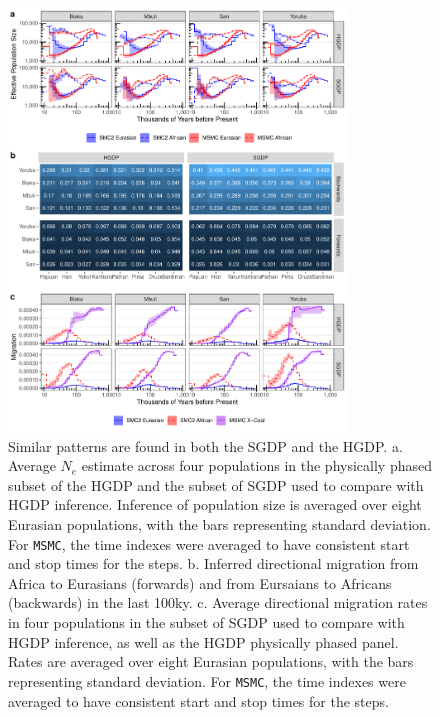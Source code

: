 \documentclass{article}
\begin{document}
\begin{figure}
	\centering
	\includegraphics[width=0.8\textwidth]{plot/both_figure.pdf}
	\caption{Similar patterns are found in both the SGDP and the HGDP. a. Average $N_e$ estimate across four populations in the physically phased subset of the HGDP and the subset of SGDP used to compare with HGDP inference. Inference of population size is averaged over eight Eurasian populations, with the bars representing standard deviation. For {\tt MSMC}, the time indexes were averaged to have consistent start and stop times for the steps. b. Inferred directional migration from Africa to Eurasians (forwards) and from Eursaians to Africans (backwards) in the last 100ky. c. Average directional migration rates in four populations in the subset of SGDP used to compare with HGDP inference, as well as the HGDP physically phased panel. Rates are averaged over eight Eurasian populations, with the bars representing standard deviation. For {\tt MSMC}, the time indexes were averaged to have consistent start and stop times for the steps.}
	\label{fig:both}
\end{figure}
\end{document}
